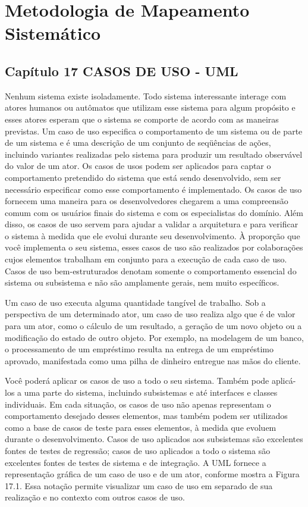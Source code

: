 \documentclass[12pt,a4paper]{article}
\begin{document}
\section{Metodologia de Mapeamento Sistemático}
\subsection{Capítulo 17
CASOS DE USO - UML}
Nenhum sistema existe isoladamente. Todo sistema interessante interage
com atores humanos ou autômatos que utilizam esse sistema para algum propósito e esses atores esperam que o sistema se comporte de acordo com as maneiras previstas. Um caso de uso especifica o comportamento de um sistema ou de
parte de um sistema e é uma descrição de um conjunto de seqüências de ações,
incluindo variantes realizadas pelo sistema para produzir um resultado observável do valor de um ator.
Os casos de usos podem ser aplicados para captar o comportamento pretendido do sistema que está sendo desenvolvido, sem ser necessário especificar
como esse comportamento é implementado. Os casos de uso fornecem uma maneira para os desenvolvedores chegarem a uma compreensão comum com os
usuários finais do sistema e com os especialistas do domínio. Além disso, os casos de uso servem para ajudar a validar a arquitetura e para verificar o sistema à
medida que ele evolui durante seu desenvolvimento. À proporção que você implementa o seu sistema, esses casos de uso são realizados por colaborações cujos
elementos trabalham em conjunto para a execução de cada caso de uso.
Casos de uso bem-estruturados denotam somente o comportamento essencial do sistema ou subsistema e não são amplamente gerais, nem muito específicos.

Um caso de uso executa alguma quantidade tangível de trabalho. Sob a
perspectiva de um determinado ator, um caso de uso realiza algo que é de valor
para um ator, como o cálculo de um resultado, a geração de um novo objeto ou
a modificação do estado de outro objeto. Por exemplo, na modelagem de um
banco, o processamento de um empréstimo resulta na entrega de um empréstimo aprovado, manifestada como uma pilha de dinheiro entregue nas mãos do
cliente.

Você poderá aplicar os casos de uso a todo o seu sistema. Também pode
aplicá-los a uma parte do sistema, incluindo subsistemas e até interfaces e classes
individuais. Em cada situação, os casos de uso não apenas representam o comportamento desejado desses elementos, mas também podem ser utilizados como
a base de casos de teste para esses elementos, à medida que evoluem durante o
desenvolvimento. Casos de uso aplicados aos subsistemas são excelentes fontes
de testes de regressão; casos de uso aplicados a todo o sistema são excelentes
fontes de testes de sistema e de integração. A UML fornece a representação gráfica de um caso de uso e de um ator, conforme mostra a Figura 17.1. Essa notação permite visualizar um caso de uso em separado de sua realização e no contexto com outros casos de uso.
\end{document}
